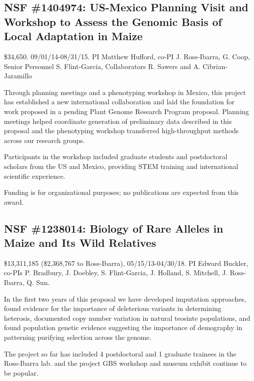 \subsection*{NSF \#1404974: US-Mexico Planning Visit and Workshop to Assess the Genomic Basis of Local Adaptation in Maize} 
\$34,650. 09/01/14-08/31/15. PI Matthew Hufford, co-PI J. Ross-Ibarra, G. Coop, Senior Personnel S. Flint-Garcia, Collaborators R. Sawers and A. Cibrian-Jaramillo
\par{} Through planning meetings and a phenotyping workshop in Mexico, this project has established a new international collaboration and laid the foundation for work proposed in a pending Plant Genome Research Program proposal. Planning meetings helped coordinate generation of preliminary data described in this proposal and the phenotyping workshop transferred high-throughput methods across our research groups.
\par{} Participants in the  workshop included graduate students and postdoctoral scholars from the US and Mexico, providing STEM training and international scientific experience.
\par{} Funding is for organizational purposes; no publications are expected from this award.

\subsection*{NSF \#1238014: Biology of Rare Alleles in Maize and Its Wild Relatives} 
\$13,311,185 (\$2,368,767 to Ross-Ibarra), 05/15/13-04/30/18. PI Edward Buckler, co-PIs P. Bradbury, J. Doebley,  S. Flint-Garcia, J. Holland,  S. Mitchell, J. Ross-Ibarra, Q. Sun.
\par{} In the first two years of this proposal we have developed imputation approaches, found evidence for the importance of deleterious variants in determining heterosis, documented copy number variation in natural teosinte populations, and found population genetic evidence suggesting the importance of demography in patterning purifying selection across the genome. 
\par{} The project so far has included 4 postdoctoral and 1 graduate trainees in the Ross-Ibarra lab. and the project GBS workshop and museum exhibit continue to be popular. 
\par{} \citet{tiffin2014advances, Takuno15062015, da2015origin, hake2015genetic, makarevitch2015transposable}

